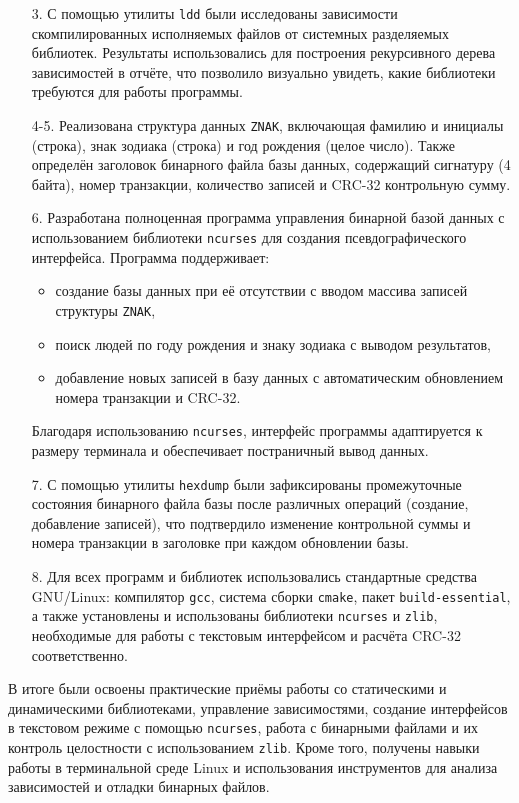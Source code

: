 \begin{itemize}
    \item[3.] С помощью утилиты \texttt{ldd} были исследованы зависимости скомпилированных исполняемых файлов от системных разделяемых библиотек. Результаты использовались для построения рекурсивного дерева зависимостей в отчёте, что позволило визуально увидеть, какие библиотеки требуются для работы программы.

    \item[4-5.] Реализована структура данных \texttt{ZNAK}, включающая фамилию и инициалы (строка), знак зодиака (строка) и год рождения (целое число). Также определён заголовок бинарного файла базы данных, содержащий сигнатуру (4 байта), номер транзакции, количество записей и CRC-32 контрольную сумму.

    \item[6.] Разработана полноценная программа управления бинарной базой данных с использованием библиотеки \texttt{ncurses} для создания псевдографического интерфейса. Программа поддерживает:
    \begin{itemize}
        \item создание базы данных при её отсутствии с вводом массива записей структуры \texttt{ZNAK},
        \item поиск людей по году рождения и знаку зодиака с выводом результатов,
        \item добавление новых записей в базу данных с автоматическим обновлением номера транзакции и CRC-32.
    \end{itemize}
    Благодаря использованию \texttt{ncurses}, интерфейс программы адаптируется к размеру терминала и обеспечивает постраничный вывод данных.

    \item[7.] С помощью утилиты \texttt{hexdump} были зафиксированы промежуточные состояния бинарного файла базы после различных операций (создание, добавление записей), что подтвердило изменение контрольной суммы и номера транзакции в заголовке при каждом обновлении базы.

    \item[8.] Для всех программ и библиотек использовались стандартные средства GNU/Linux: компилятор \texttt{gcc}, система сборки \texttt{cmake}, пакет \break\texttt{build-essential}, а также установлены и использованы библиотеки \texttt{ncurses} и \texttt{zlib}, необходимые для работы с текстовым интерфейсом и расчёта CRC-32 соответственно.
\end{itemize}

В итоге были освоены практические приёмы работы со статическими и динамическими библиотеками, управление зависимостями, создание интерфейсов в текстовом режиме с помощью \texttt{ncurses}, работа с бинарными файлами и их контроль целостности с использованием \texttt{zlib}. Кроме того, получены навыки работы в терминальной среде Linux и использования инструментов для анализа зависимостей и отладки бинарных файлов.
